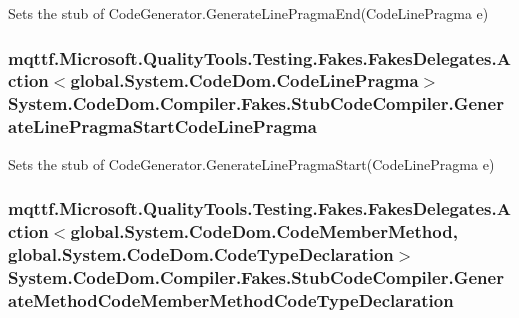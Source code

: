 Sets the stub of Code\-Generator.\-Generate\-Line\-Pragma\-End(\-Code\-Line\-Pragma e)

\hypertarget{class_system_1_1_code_dom_1_1_compiler_1_1_fakes_1_1_stub_code_compiler_af46d11ec4ff2a6508b0e0e33ccde69f6}{
\subsubsection[{Generate\-Line\-Pragma\-Start\-Code\-Line\-Pragma}]{\setlength{\rightskip}{0pt plus 5cm}mqttf.\-Microsoft.\-Quality\-Tools.\-Testing.\-Fakes.\-Fakes\-Delegates.\-Action$<$global.\-System.\-Code\-Dom.\-Code\-Line\-Pragma$>$ System.\-Code\-Dom.\-Compiler.\-Fakes.\-Stub\-Code\-Compiler.\-Generate\-Line\-Pragma\-Start\-Code\-Line\-Pragma}}\label{class_system_1_1_code_dom_1_1_compiler_1_1_fakes_1_1_stub_code_compiler_af46d11ec4ff2a6508b0e0e33ccde69f6}


Sets the stub of Code\-Generator.\-Generate\-Line\-Pragma\-Start(\-Code\-Line\-Pragma e)

\hypertarget{class_system_1_1_code_dom_1_1_compiler_1_1_fakes_1_1_stub_code_compiler_a698dd5bebb165898782078cf9464aee8}{
\subsubsection[{Generate\-Method\-Code\-Member\-Method\-Code\-Type\-Declaration}]{\setlength{\rightskip}{0pt plus 5cm}mqttf.\-Microsoft.\-Quality\-Tools.\-Testing.\-Fakes.\-Fakes\-Delegates.\-Action$<$global.\-System.\-Code\-Dom.\-Code\-Member\-Method, global.\-System.\-Code\-Dom.\-Code\-Type\-Declaration$>$ System.\-Code\-Dom.\-Compiler.\-Fakes.\-Stub\-Code\-Compiler.\-Generate\-Method\-Code\-Member\-Method\-Code\-Type\-Declaration}}\label{class_system_1_1_code_dom_1_1_compiler_1_1_fakes_1_1_stub_code_compiler_a698dd5bebb165898782078cf9464aee8}



